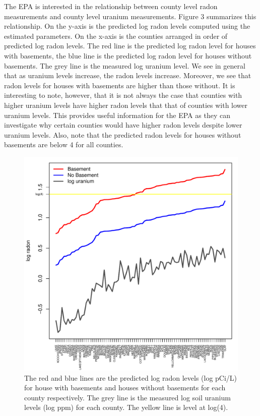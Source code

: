 \documentclass{article}
\def\beginmyfig{\begin{figure}[htbp]\begin{center}}
\def\endmyfig{\end{center}\end{figure}}
\begin{document}
\noindent
The EPA is interested in the relationship between county level radon
measurements and county level uranium measurements. Figure 3 summarizes this
relationship. On the y-axis is the predicted log radon levels computed using
the estimated parameters. On the x-axis is the counties arranged in order of
predicted log radon levels. The red line is the predicted log radon level
for houses with basements, the blue line is the predicted log radon level
for houses without basements. The grey line is the measured log uranium level.
We see in general that as uranium levels increase, the radon levels increase. 
Moreover, we see that radon levels for houses with basements are higher than
those without. It is interesting to note, however, that it is not always the
case that counties with higher uranium levels have higher radon levels that
that of counties with lower uranium levels. This provides useful information
for the EPA as they can investigate why certain counties would have higher 
radon levels despite lower uranium levels. Also, note that the predicted 
radon levels for houses without basements are below 4 for all counties.\\

\beginmyfig \includegraphics[scale=.5]{images/ym.pdf}  
            \caption{The red and blue lines are the predicted log radon levels
            (log pCi/L) for house with basements and houses without basements
            for each county respectively. The grey line is the measured log
            soil uranium levels (log ppm) for each county. The yellow line
            is level at log(4).}\endmyfig 
\end{document}

